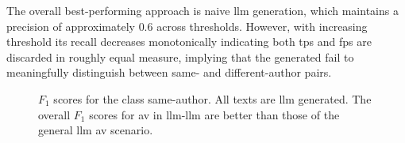 The overall best-performing approach is naive \ac{llm} generation, which maintains a precision of approximately $0.6$ across thresholds.  
However, with increasing threshold its recall decreases monotonically indicating both \acp{tp} and \acp{fp} are discarded in roughly equal measure, implying that the generated \imps{} fail to meaningfully distinguish between same- and different-author pairs.


  \begin{figure}[h]
    \centering
    
    \caption{$F_1$ scores for the class same-author.
  All texts are \ac{llm} generated.
  The overall $F_1$ scores for \ac{av} in \ac{llm}-\ac{llm} are better than those of the general \ac{llm} \ac{av} scenario.
  }
    \label{fig:llm-llm_f1}
  \end{figure}

